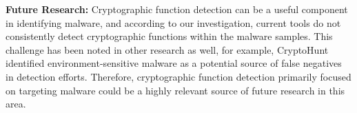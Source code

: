 
\begin{takeaway}
\textbf{Future Research:} Cryptographic function detection can be a useful component in identifying malware, and according to our investigation, current tools do not consistently detect cryptographic functions within the malware samples.  This challenge has been noted in other research as well, for example, CryptoHunt identified environment-sensitive malware as a potential source of false negatives in detection efforts. Therefore, cryptographic function detection primarily focused on targeting malware could be a highly relevant source of future research in this area.
\end{takeaway}




